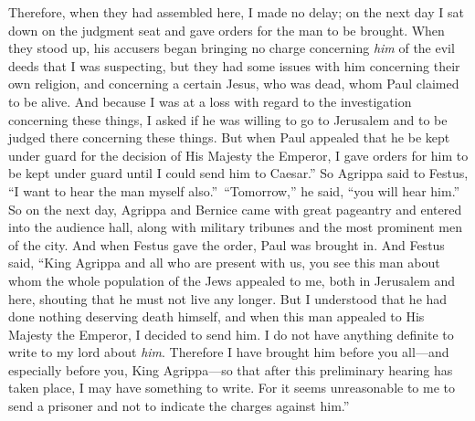 \begin{biblechapter}
\verse Therefore, when they had assembled here, I made no delay; on the next day I sat down on the judgment seat and gave orders for the man to be brought.
\verse When they stood up, his accusers began bringing no charge concerning \textit{him} of the evil deeds that I was suspecting,
\verse but they had some issues with him concerning their own religion, and concerning a certain Jesus, who was dead, whom Paul claimed to be alive.
\verse And because I was at a loss with regard to the investigation concerning these things, I asked if he was willing to go to Jerusalem and to be judged there concerning these things.
\verse But when Paul appealed that he be kept under guard for the decision of His Majesty the Emperor, I gave orders for him to be kept under guard until I could send him to Caesar.”
\verse So Agrippa said to Festus, “I want to hear the man myself also.” “Tomorrow,” he said, “you will hear him.”
\verse So on the next day, Agrippa and Bernice came with great pageantry and entered into the audience hall, along with military tribunes and the most prominent men of the city. And when Festus gave the order, Paul was brought in.
\verse And Festus said, “King Agrippa and all who are present with us, you see this man about whom the whole population of the Jews appealed to me, both in Jerusalem and here, shouting that he must not live any longer.
\verse But I understood that he had done nothing deserving death himself, and when this man appealed to His Majesty the Emperor, I decided to send him.
\verse I do not have anything definite to write to my lord about \textit{him}. Therefore I have brought him before you all—and especially before you, King Agrippa—so that after this preliminary hearing has taken place, I may have something to write.
\verse For it seems unreasonable to me to send a prisoner and not to indicate the charges against him.”
\end{biblechapter}

